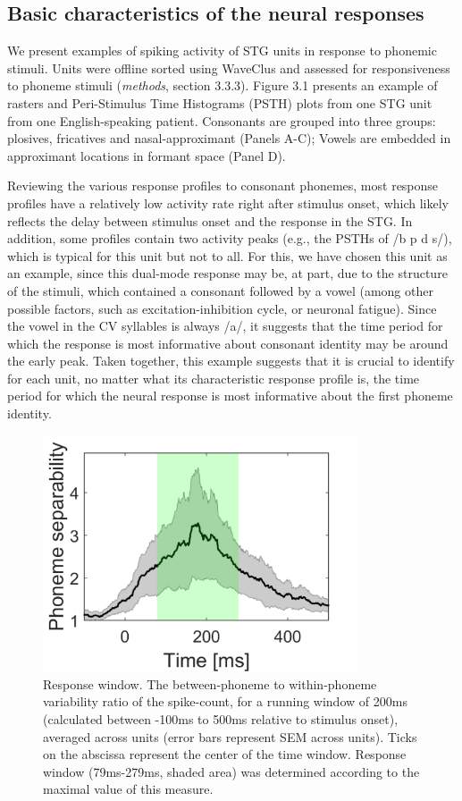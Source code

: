 \subsection{Basic characteristics of the neural responses}
We present examples of spiking activity of STG units in response to phonemic stimuli. Units were offline sorted using WaveClus and assessed for responsiveness to phoneme stimuli (\textit{methods}, section 3.3.3). Figure 3.1 presents an example of rasters and Peri-Stimulus Time Histograms (PSTH) plots from one STG unit from one English-speaking patient. Consonants are grouped into three groups: plosives, fricatives and nasal-approximant (Panels A-C); Vowels are embedded in approximant locations in formant space (Panel D). 

Reviewing the various response profiles to consonant phonemes, most response profiles have a relatively low activity rate right after stimulus onset, which likely reflects the delay between stimulus onset and the response in the STG. In addition, some profiles contain two activity peaks (e.g., the PSTHs of /b p d s/), which is typical for this unit but not to all. For this, we have chosen this unit as an example, since this dual-mode response may be, at part, due to the structure of the stimuli, which contained a consonant followed by a vowel (among other possible factors, such as excitation-inhibition cycle, or neuronal fatigue). Since the vowel in the CV syllables is always /a/, it suggests that the time period for which the response is most informative about consonant identity may be around the early peak. Taken together, this example suggests that it is crucial to identify for each unit, no matter what its characteristic response profile is, the time period for which the neural response is most informative about the first phoneme identity.

\begin{figure}[H]
\vspace{.3in}
\includegraphics[width=\linewidth, height=7cm]{Figures/Ch3/f_stat_optimal_window.png}
\caption{Response window. The between-phoneme to within-phoneme variability ratio of the spike-count, for a running window of 200ms (calculated between -100ms to 500ms relative to stimulus onset), averaged across units (error bars represent SEM across units). Ticks on the abscissa represent the center of the time window. Response window (79ms-279ms, shaded area) was determined according to the maximal value of this measure.}
\end{figure}

